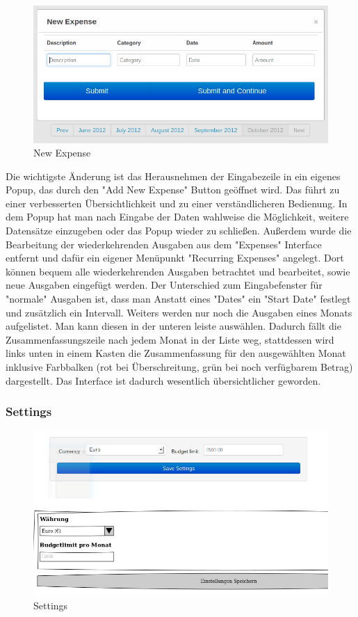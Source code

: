 \documentclass[a4paper,10pt]{article}
\begin{document}
\begin{figure}
\centering
\includegraphics[width=\textwidth]{expenses-new-ip}
\caption{New Expense} \label{fig:expenses-new}
\end{figure}

Die wichtigste Änderung ist das Herausnehmen der Eingabezeile in ein eigenes Popup, das durch den "Add New Expense" Button
geöffnet wird. Das führt zu einer verbesserten Übersichtlichkeit und zu einer verständlicheren Bedienung.
In dem Popup hat man nach Eingabe der Daten wahlweise die Möglichkeit, weitere Datensätze einzugeben oder das Popup wieder
zu schließen. Außerdem wurde die Bearbeitung der wiederkehrenden Ausgaben aus dem "Expenses" Interface entfernt und dafür
ein eigener Menüpunkt "Recurring Expenses" angelegt. Dort können bequem alle wiederkehrenden Ausgaben betrachtet und
bearbeitet, sowie neue Ausgaben eingefügt werden. Der Unterschied zum Eingabefenster für "normale" Ausgaben ist,
dass man Anstatt eines "Dates" ein "Start Date" festlegt und zusätzlich ein Intervall.
Weiters werden nur noch die Ausgaben eines Monats aufgelistet. Man kann diesen in der unteren leiste auswählen. Dadurch fällt
die Zusammenfassungszeile nach jedem Monat in der Liste weg, stattdessen wird links unten in einem Kasten die Zusammenfassung
für den ausgewählten Monat inklusive Farbbalken (rot bei Überschreitung, grün bei noch verfügbarem Betrag) dargestellt.
Das Interface ist dadurch wesentlich übersichtlicher geworden.

\clearpage
\subsubsection{Settings}

\begin{figure}
\centering
\includegraphics[width=\textwidth]{settings}
\caption{Settings} \label{fig:settings}
\end{figure}
\end{document}
